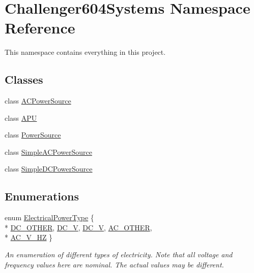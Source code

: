 \hypertarget{namespace_challenger604_systems}{\section{Challenger604\-Systems Namespace Reference}
\label{namespace_challenger604_systems}
}


This namespace contains everything in this project.  


\subsection*{Classes}
\begin{DoxyCompactItemize}
\item 
class \hyperlink{class_challenger604_systems_1_1_a_c_power_source}{A\-C\-Power\-Source}
\item 
class \hyperlink{class_challenger604_systems_1_1_a_p_u}{A\-P\-U}
\item 
class \hyperlink{class_challenger604_systems_1_1_power_source}{Power\-Source}
\item 
class \hyperlink{class_challenger604_systems_1_1_simple_a_c_power_source}{Simple\-A\-C\-Power\-Source}
\item 
class \hyperlink{class_challenger604_systems_1_1_simple_d_c_power_source}{Simple\-D\-C\-Power\-Source}
\end{DoxyCompactItemize}
\subsection*{Enumerations}
\begin{DoxyCompactItemize}
\item 
enum \hyperlink{namespace_challenger604_systems_a9ad1a793d94b97514092692cb7315afd}{Electrical\-Power\-Type} \{ \\*
\hyperlink{namespace_challenger604_systems_a9ad1a793d94b97514092692cb7315afdac443cb4f2e9c8fb362d1b23d390680c1}{D\-C\-\_\-\-O\-T\-H\-E\-R}, 
\hyperlink{namespace_challenger604_systems_a9ad1a793d94b97514092692cb7315afdaeb46efa4ea7afd565b7f41c0881a206d}{D\-C\-\_\-V}, 
\hyperlink{namespace_challenger604_systems_a9ad1a793d94b97514092692cb7315afdaa549263d4db7adacf1008dac6a68b21d}{D\-C\-\_\-V}, 
\hyperlink{namespace_challenger604_systems_a9ad1a793d94b97514092692cb7315afda2fcb938b597382142bdc684898fe8596}{A\-C\-\_\-\-O\-T\-H\-E\-R}, 
\\*
\hyperlink{namespace_challenger604_systems_a9ad1a793d94b97514092692cb7315afdade695fe37c4e590d464845feb03fcfde}{A\-C\-\_\-V\-\_\-H\-Z}
 \}
\begin{DoxyCompactList}\small\item\em An enumeration of different types of electricity. Note that all voltage and frequency values here are nominal. The actual values may be different. \end{DoxyCompactList}\end{DoxyCompactItemize}


